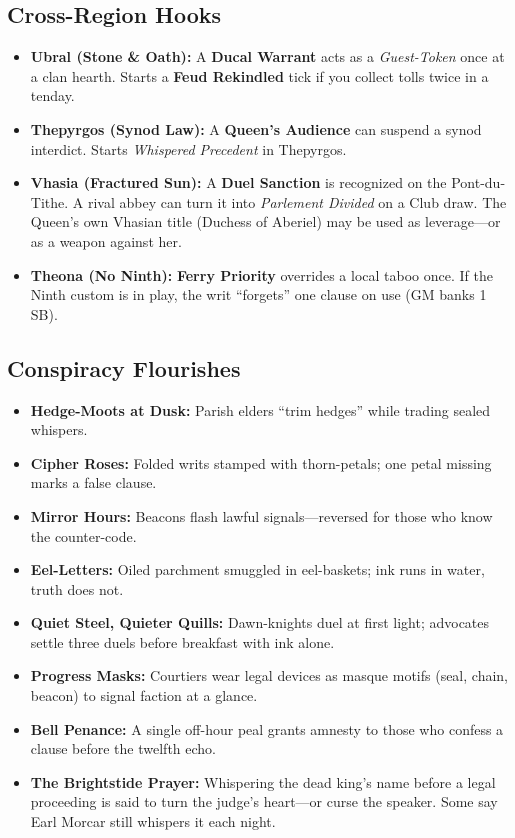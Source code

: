 \begin{itemize}[nosep]
\subsection{Cross-Region Hooks}

\begin{itemize}[nosep]
  \item \textbf{Ubral (Stone \& Oath):} A \textbf{Ducal Warrant} acts as a \emph{Guest-Token} once at a clan hearth. Starts a \textbf{Feud Rekindled} tick if you collect tolls twice in a tenday.
  \item \textbf{Thepyrgos (Synod Law):} A \textbf{Queen's Audience} can suspend a synod interdict. Starts \emph{Whispered Precedent} in Thepyrgos.
  \item \textbf{Vhasia (Fractured Sun):} A \textbf{Duel Sanction} is recognized on the Pont-du-Tithe. A rival abbey can turn it into \emph{Parlement Divided} on a Club draw. The Queen's own Vhasian title (Duchess of Aberiel) may be used as leverage---or as a weapon against her.
  \item \textbf{Theona (No Ninth):} \textbf{Ferry Priority} overrides a local taboo once. If the Ninth custom is in play, the writ ``forgets'' one clause on use (GM banks 1 SB).
\end{itemize}

\subsection{Conspiracy Flourishes}

\begin{itemize}[nosep]
  \item \textbf{Hedge-Moots at Dusk:} Parish elders ``trim hedges'' while trading sealed whispers.
  \item \textbf{Cipher Roses:} Folded writs stamped with thorn-petals; one petal missing marks a false clause.
  \item \textbf{Mirror Hours:} Beacons flash lawful signals---reversed for those who know the counter-code.
  \item \textbf{Eel-Letters:} Oiled parchment smuggled in eel-baskets; ink runs in water, truth does not.
  \item \textbf{Quiet Steel, Quieter Quills:} Dawn-knights duel at first light; advocates settle three duels before breakfast with ink alone.
  \item \textbf{Progress Masks:} Courtiers wear legal devices as masque motifs (seal, chain, beacon) to signal faction at a glance.
  \item \textbf{Bell Penance:} A single off-hour peal grants amnesty to those who confess a clause before the twelfth echo.
  \item \textbf{The Brightstide Prayer:} Whispering the dead king's name before a legal proceeding is said to turn the judge's heart---or curse the speaker. Some say Earl Morcar still whispers it each night.
\end{itemize}


\end{itemize}
